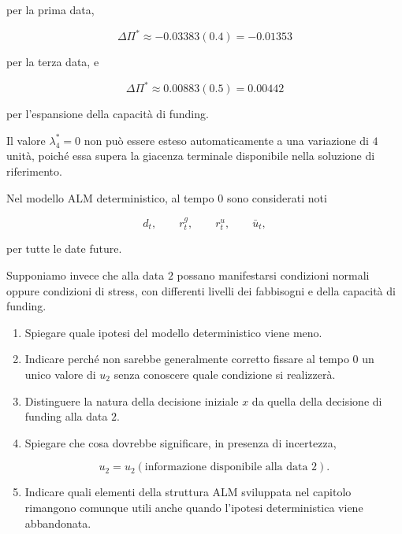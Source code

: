 per la prima data,

\[
\Delta\Pi^*
\approx
-0.03383(0.4)
=
-0.01353
\]

per la terza data, e

\[
\Delta\Pi^*
\approx
0.00883(0.5)
=
0.00442
\]

per l'espansione della capacit\`a di funding.

Il valore $\lambda_4^*=0$ non pu\`o essere esteso automaticamente a una
variazione di $4$ unit\`a, poich\'e essa supera la giacenza terminale
disponibile nella soluzione di riferimento.


\begin{exercise}

\label{ex:cap12-proposto-deterministico-incertezza}

Nel modello ALM deterministico, al tempo $0$ sono considerati noti

\[
d_t,
\qquad
r^g_t,
\qquad
r^u_t,
\qquad
\bar u_t,
\]

per tutte le date future.

Supponiamo invece che alla data $2$ possano manifestarsi condizioni normali
oppure condizioni di stress, con differenti livelli dei fabbisogni e della
capacit\`a di funding.

\begin{enumerate}

\item Spiegare quale ipotesi del modello deterministico viene meno.

\item Indicare perch\'e non sarebbe generalmente corretto fissare al tempo
$0$ un unico valore di $u_2$ senza conoscere quale condizione si
realizzer\`a.

\item Distinguere la natura della decisione iniziale $x$ da quella della
decisione di funding alla data $2$.

\item Spiegare che cosa dovrebbe significare, in presenza di incertezza,

\[
u_2
=
u_2(\text{informazione disponibile alla data }2).
\]

\item Indicare quali elementi della struttura ALM sviluppata nel capitolo
rimangono comunque utili anche quando l'ipotesi deterministica viene
abbandonata.

\end{enumerate}

\end{exercise}


